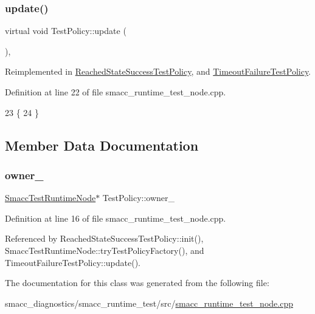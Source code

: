 \subsubsection{\texorpdfstring{update()}{update()}}
{\footnotesize\ttfamily virtual void Test\+Policy\+::update (\begin{DoxyParamCaption}{ }\end{DoxyParamCaption})\hspace{0.3cm}{\ttfamily [inline]}, {\ttfamily [virtual]}}



Reimplemented in \hyperlink{classReachedStateSuccessTestPolicy_a34696eeabca13524db58dc8c72ffac6c}{Reached\+State\+Success\+Test\+Policy}, and \hyperlink{classTimeoutFailureTestPolicy_a51946c46616697b0b0d9d7c7aaef9f22}{Timeout\+Failure\+Test\+Policy}.



Definition at line 22 of file smacc\+\_\+runtime\+\_\+test\+\_\+node.\+cpp.


\begin{DoxyCode}
23   \{
24   \}
\end{DoxyCode}


\subsection{Member Data Documentation}
\mbox{\label{classTestPolicy_a717c3e59e35216a175398b85575aec43}} 
\subsubsection{\texorpdfstring{owner\+\_\+}{owner\_}}
{\footnotesize\ttfamily \hyperlink{classSmaccTestRuntimeNode}{Smacc\+Test\+Runtime\+Node}$\ast$ Test\+Policy\+::owner\+\_\+}



Definition at line 16 of file smacc\+\_\+runtime\+\_\+test\+\_\+node.\+cpp.



Referenced by Reached\+State\+Success\+Test\+Policy\+::init(), Smacc\+Test\+Runtime\+Node\+::try\+Test\+Policy\+Factory(), and Timeout\+Failure\+Test\+Policy\+::update().



The documentation for this class was generated from the following file\+:\begin{DoxyCompactItemize}
\item 
smacc\+\_\+diagnostics/smacc\+\_\+runtime\+\_\+test/src/\hyperlink{smacc__runtime__test__node_8cpp}{smacc\+\_\+runtime\+\_\+test\+\_\+node.\+cpp}\end{DoxyCompactItemize}
